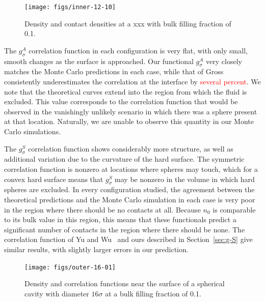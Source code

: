 \documentclass[letterpaper,twocolumn,amsmath,amssymb,jcp,10pt,aip]{revtex4-1}
\begin{document}
\begin{figure}
  \texttt{[image: figs/inner-12-10]}
  \caption{Density and contact densities at a xxx with bulk filling
    fraction of 0.1.}
  \label{fig:inner-12-10}
\end{figure}

The $g_\sigma^A$ correlation function in each configuration is very
flat, with only small, smooth changes as the surface is approached.
Our functional $g_\sigma^A$ very closely matches the Monte Carlo
predictions in each case, while that of Gross consistently
underestimates the correlation at the interface by
\textcolor{red}{several percent}.  We note that the theoretical curves
extend into the region from which the fluid is excluded.  This value
corresponds to the correlation function that would be observed in the
vanishingly unlikely scenario in which there was a sphere present at
that location.  Naturally, we are unable to observe this quantity in
our Monte Carlo simulations.

The $g_\sigma^S$ correlation function shows considerably more
structure, as well as additional variation due to the curvature of the
hard surface.  The symmetric correlation function is nonzero at
locations where spheres may touch, which for a convex hard surface
means that $g_\sigma^S$ may be nonzero in the volume in which hard
spheres are excluded.  In every configuration studied, the agreement
between the theoretical predictions and the Monte Carlo simulation in
each case is very poor in the region where there should be no contacts
at all.  Because $n_0$ is comparable to its bulk value in this region,
this means that these functionals predict a significant number of
contacts in the region where there should be none.  The correlation
function of Yu and Wu~\cite{yu2002fmt-dft-inhomogeneous-associating}
and ours described in Section~\ref{sec:g-S} give similar results, with
slightly larger errors in our prediction.

\begin{figure}
  \texttt{[image: figs/outer-16-01]}
  \caption{Density and correlation functions near the surface of a
    spherical cavity with diameter $16\sigma$ at a bulk filling
    fraction of 0.1.}
  \label{fig:outer-10}
\end{figure}



\end{document}
